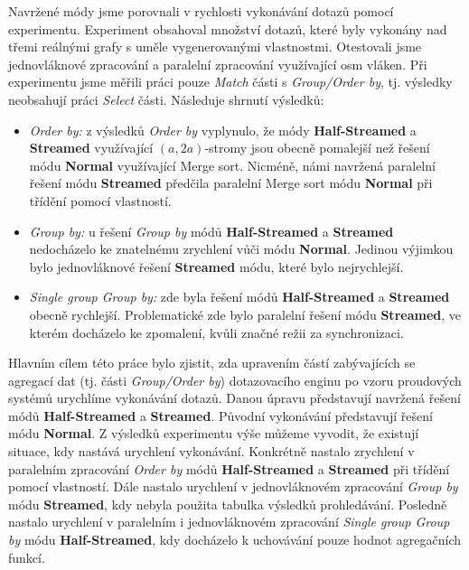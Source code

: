Navržené módy jsme porovnali v rychlosti vykonávání dotazů pomocí experimentu.
Experiment obsahoval množství dotazů, které byly vykonány nad třemi reálnými grafy s uměle vygenerovanými vlastnostmi.
Otestovali jsme jednovláknové zpracování a paralelní zpracování využívající osm vláken.
Při experimentu jsme měřili práci pouze \textit{Match} části s \textit{Group/Order by}, tj. výsledky neobsahují práci \textit{Select} části.
Následuje shrnutí výsledků:
\begin{itemize}

\item \textit{Order by:} z výsledků \textit{Order by} vyplynulo, že módy \textbf{Half-Streamed} a \textbf{Streamed} využívající $(a, 2a)$-stromy jsou obecně pomalejší než řešení módu \textbf{Normal} využívající Merge sort.
Nicméně, námi navržená paralelní řešení módu \textbf{Streamed} předčila paralelní Merge sort módu \textbf{Normal} při třídění pomocí vlastností.

\item \textit{Group by:} u řešení \textit{Group by} módů \textbf{Half-Streamed} a \textbf{Streamed} nedocházelo ke znatelnému zrychlení vůči módu \textbf{Normal}.
Jedinou výjimkou bylo jednovláknové řešení \textbf{Streamed} módu, které bylo nejrychlejší.

\item \textit{Single group Group by:} zde byla řešení módů \textbf{Half-Streamed} a \textbf{Streamed} obecně rychlejší.
Problematické zde bylo paralelní řešení módu \textbf{Streamed}, ve kterém docházelo ke zpomalení, kvůli značné režii za synchronizaci.

\end{itemize}

Hlavním cílem této práce bylo zjistit, zda upravením částí zabývajících se agregací dat (tj. části  \textit{Group/Order by}) dotazovacího enginu po vzoru proudových systémů urychlíme vykonávání dotazů.
Danou úpravu představují navržená řešení módů \textbf{Half-Streamed} a \textbf{Streamed}.
Původní vykonávání představují řešení módu \textbf{Normal}.
Z výsledků experimentu výše můžeme vyvodit, že existují situace, kdy nastává urychlení vykonávání.
Konkrétně nastalo zrychlení v paralelním zpracování \textit{Order by} módů \textbf{Half-Streamed} a \textbf{Streamed} při třídění pomocí vlastností.
Dále nastalo urychlení v jednovláknovém zpracování \textit{Group by} módu \textbf{Streamed}, kdy nebyla použita tabulka výsledků prohledávání.
Posledně nastalo urychlení v paralelním i jednovláknovém zpracování \textit{Single group Group by} módu \textbf{Half-Streamed}, kdy docházelo k uchovávání pouze hodnot agregačních funkcí.

